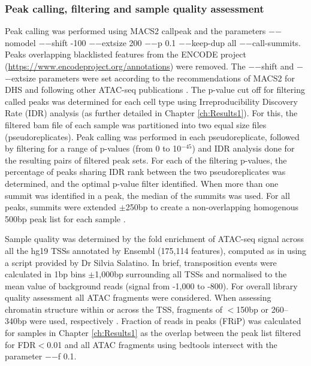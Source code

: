 \subsubsection{Peak calling, filtering and sample quality assessment}
Peak calling was performed using MACS2  callpeak \parencite{Zhang2008} and the parameters $-$$-$nomodel $-$$-$shift -100 $-$$-$extsize 200 $-$$-$p 0.1 $-$$-$keep-dup all $-$$-$call-summits. Peaks overlapping blacklisted features from the ENCODE project (\url{https://www.encodeproject.org/annotations}) were removed. The $-$$-$shift and $-$$-$extsize parameters were set according to the recommendations of MACS2 for DHS and following other ATAC-seq publications \parencite{Buenrostro2015, Corces2016}. The p-value cut off for filtering called peaks was determined for each cell type using Irreproducibility Discovery Rate (IDR) analysis (as further detailed in Chapter \ref{ch:Results1}). For this, the filtered bam file of each sample was partitioned into two equal size files (pseudoreplicates). Peak calling was performed in each pseudoreplicate, followed by filtering for a range of p-values (from 0 to 10$^{-45}$) and IDR analysis done for the resulting pairs of filtered peak sets. For each of the filtering p-values, the percentage of peaks sharing IDR rank between the two pseudoreplicates was determined, and the optimal p-value filter identified. When more than one summit was identified in a peak, the median of the summits was used. For all peaks, summits were extended $\pm$250bp to create a non-overlapping homogenous 500bp peak list for each sample \parencite{Buenrostro2015, Corces2016}. 

Sample quality was determined by the fold enrichment of ATAC-seq signal across all the hg19 TSSs annotated by Ensembl (175,114 features), computed as in \parencite{Buenrostro2015} using a script provided by Dr Silvia Salatino. In brief, transposition events were calculated in 1bp bins $\pm$1,000bp surrounding all TSSs and normalised to the mean value of background reads (signal from -1,000 to -800). For overall library quality assessment all ATAC fragments were considered. When assessing chromatin structure within or across the TSS, fragments of $<$150bp or 260–340bp were used, respectively \parencite{Scharer2016}. Fraction of reads in peaks (FRiP) was calculated for samples in Chapter \ref{ch:Results1} as the overlap between the peak list filtered for FDR$<$0.01 and all ATAC fragments using bedtools intersect with the parameter $-$$-$f 0.1.

